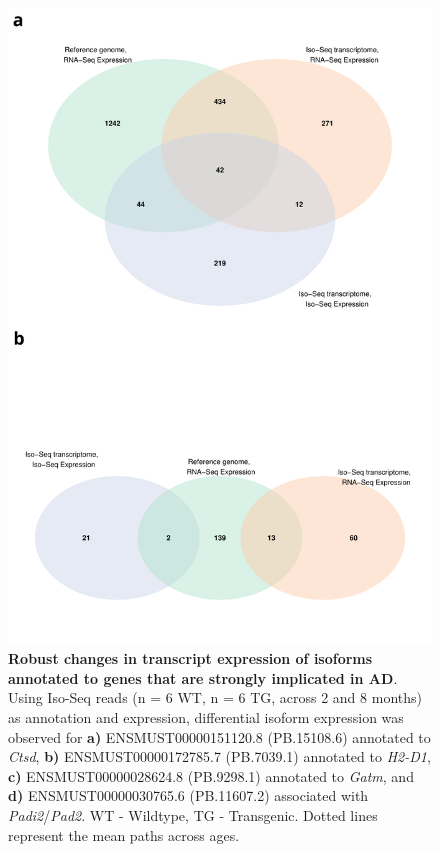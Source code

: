 \begin{figure}[!htp]
	\centering
	\includegraphics[page=18,scale = 0.55]{Figures/WholeDifferentialAnalysis.pdf}
	\captionsetup{width=0.95\textwidth}
	\caption[Robust changes in transcript expression of isoforms annotated to genes that are strongly implicated in AD]%
	{\textbf{Robust changes in transcript expression of isoforms annotated to genes that are strongly implicated in AD}. Using Iso-Seq reads (n = 6 WT, n = 6 TG, across 2 and 8 months) as annotation and expression, differential isoform expression was observed for \textbf{a)} ENSMUST00000151120.8 (PB.15108.6) annotated to \textit{Ctsd}, \textbf{b)} ENSMUST00000172785.7 (PB.7039.1) annotated to \textit{H2-D1}, \textbf{c)} ENSMUST00000028624.8 (PB.9298.1) annotated to \textit{Gatm}, and \textbf{d)} ENSMUST00000030765.6 (PB.11607.2) associated with \textit{Padi2}/\textit{Pad2}.  WT - Wildtype, TG - Transgenic. Dotted lines represent the mean paths across ages.}    
	\label{fig:DEI_ADgenes_isoseq}
\end{figure}

